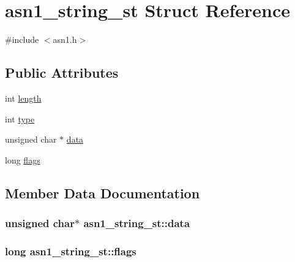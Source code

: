 \hypertarget{structasn1__string__st}{}\section{asn1\+\_\+string\+\_\+st Struct Reference}
\label{structasn1__string__st}


{\ttfamily \#include $<$asn1.\+h$>$}

\subsection*{Public Attributes}
\begin{DoxyCompactItemize}
\item 
int \hyperlink{structasn1__string__st_a425b332bd4925320832bb18c59f6a9df}{length}
\item 
int \hyperlink{structasn1__string__st_a4bc5c5a5d5cd42ec6108e8bef50e09ad}{type}
\item 
unsigned char $\ast$ \hyperlink{structasn1__string__st_a275a9784693f470debfb2b97411a4fea}{data}
\item 
long \hyperlink{structasn1__string__st_a166fa78d828cb41bb2499ad411c1774c}{flags}
\end{DoxyCompactItemize}


\subsection{Member Data Documentation}
\subsubsection[{\texorpdfstring{data}{data}}]{\setlength{\rightskip}{0pt plus 5cm}unsigned char$\ast$ asn1\+\_\+string\+\_\+st\+::data}\hypertarget{structasn1__string__st_a275a9784693f470debfb2b97411a4fea}{}\label{structasn1__string__st_a275a9784693f470debfb2b97411a4fea}
\subsubsection[{\texorpdfstring{flags}{flags}}]{\setlength{\rightskip}{0pt plus 5cm}long asn1\+\_\+string\+\_\+st\+::flags}\hypertarget{structasn1__string__st_a166fa78d828cb41bb2499ad411c1774c}{}\label{structasn1__string__st_a166fa78d828cb41bb2499ad411c1774c}
